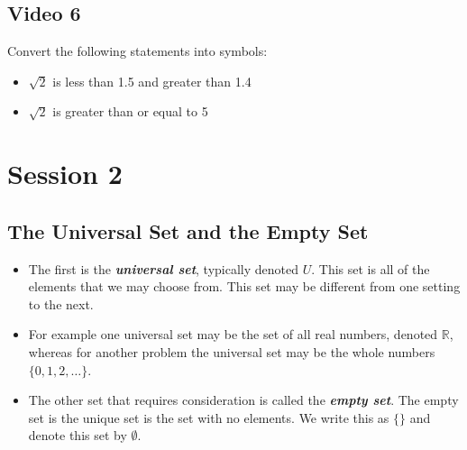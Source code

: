 \documentclass[]{report}
\begin{document}
\section{Video 6}


Convert the following statements into symbols:

\begin{itemize}
\item $\sqrt{2}$ is less than 1.5 and greater than 1.4
\item $\sqrt{2}$ is greater than or equal to 5
\end{itemize}



\chapter{Session 2}
\section*{The Universal Set and the Empty Set}
\begin{itemize}
\item The first is the \textbf{\textit{universal set}}, typically denoted $U$. This set is all of the elements that we may choose from. This set may be different from one setting to the next. 

\item For example one universal set may be the set of all real numbers, denoted $\mathbb{R}$, whereas for another problem the universal set may be the whole numbers $\{0, 1, 2,\ldots\}$.

\item The other set that requires consideration is called the \textit{\textbf{empty set}}. The empty set is the unique set is the set with no elements. We write this as $\{ \}$ and denote this set by $\emptyset$.
\end{itemize}
\end{document}
